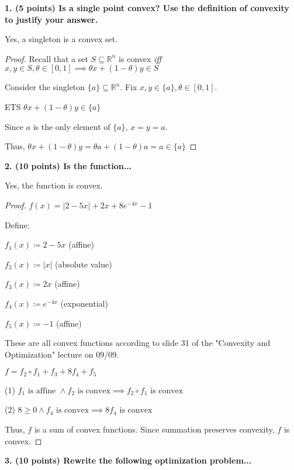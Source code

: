 \documentclass[a4paper,10pt]{article}
\theoremstyle{definition}
\begin{document}
\textbf{1. (5 points) Is a single point convex? Use the definition of convexity to justify your answer.}

Yes, a singleton is a convex set.

\begin{proof} 
Recall that a set $S \subseteq \mathbb{R}^n$ is convex \textit{iff}
$x, y \in S, \theta \in [0, 1] \implies \theta x + (1 - \theta) y \in S$

Consider the singleton $\{a\}\subseteq\mathbb{R}^n$. Fix $x, y \in \{a\}, \theta \in [0,1]$.

ETS $\theta x + (1 - \theta) y \in \{a\}$

Since $a$ is the only element of $\{a\}$, $x = y = a$.

Thus, $\theta x + (1 - \theta) y = \theta a + (1 - \theta) a = a \in \{a\}$
\end{proof} 

\bigskip
\textbf{2. (10 points) Is the function...}

Yes, the function is convex.

\begin{proof}

$f(x) = \lvert 2 - 5x\rvert + 2x + 8e^{-4x} - 1$

Define:

$f_1(x) \coloneq 2 - 5x$ (affine)

$f_2(x) \coloneq \lvert x \rvert$ (absolute value)

$f_3(x) \coloneq 2x$ (affine)

$f_4(x) \coloneq e^{-4x}$ (exponential)

$f_5(x) \coloneq - 1$ (affine)

These are all convex functions according to slide 31 of the "Convexity and Optimization" lecture on 09/09.

$f = f_2 \circ f_1 + f_3 + 8f_4 + f_5$

(1) $f_1 \text{ is affine } \land f_2 \text{ is convex} \implies f_2 \circ f_1 \text{ is convex}$

(2) $8 \geq 0 \land f_4 \text{ is convex} \implies 8f_4 \text{ is convex}$

Thus, $f$ is a sum of convex functions.
Since summation preserves convexity, $f$ is convex.
\end{proof}


\bigskip
\textbf{3. (10 points) Rewrite the following optimization problem...}
\end{document}
